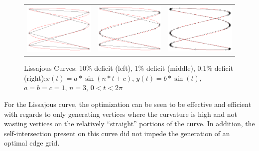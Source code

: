 \begin{figure}[h!]
  \centering
  \begin{tabular}{ccc}
  \includegraphics[width=0.3\linewidth]{Figures/lissajous01.png} &
  \includegraphics[width=0.3\linewidth]{Figures/lissajous001.png} &
  \includegraphics[width=0.3\linewidth]{Figures/lissajous0001.png}
  \end{tabular}
  \caption{\label{fig:lissajous} Lissajous Curves: 10\% deficit (left), 
1\% deficit (middle), 0.1\% deficit (right);\newline $x(t) = a * \sin(n*t 
+ c)$, $y(t) = b* \sin(t)$, $a=b=c=1$, $n=3$, $0 < t < 2\pi$}
\end{figure}

For the Lissajous curve, the optimization can be seen to be effective and 
efficient with regards to only generating vertices where the curvature is high and not wasting vertices on the relatively ``straight'' portions of the curve. In addition, the self-intersection present on this curve did not impede the generation of an optimal edge grid.


